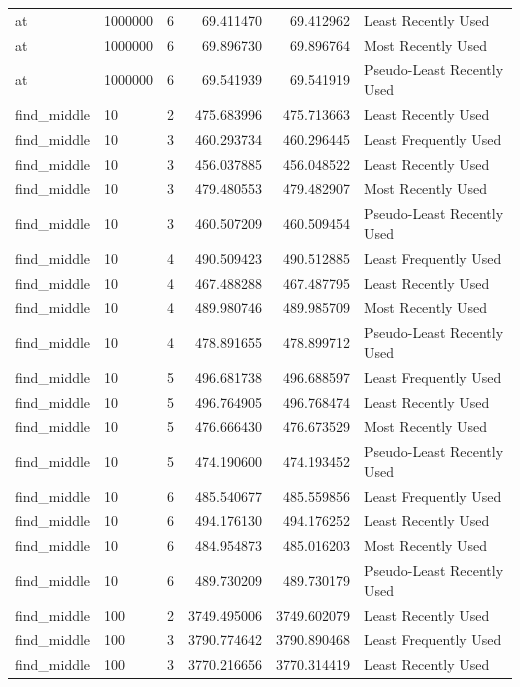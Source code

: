 \begin{tabular}{llrrrl}
at & 1000000 & 6 & 69.411470 & 69.412962 & Least Recently Used \\
at & 1000000 & 6 & 69.896730 & 69.896764 & Most Recently Used \\
at & 1000000 & 6 & 69.541939 & 69.541919 & Pseudo-Least Recently Used \\
find_middle & 10 & 2 & 475.683996 & 475.713663 & Least Recently Used \\
find_middle & 10 & 3 & 460.293734 & 460.296445 & Least Frequently Used \\
find_middle & 10 & 3 & 456.037885 & 456.048522 & Least Recently Used \\
find_middle & 10 & 3 & 479.480553 & 479.482907 & Most Recently Used \\
find_middle & 10 & 3 & 460.507209 & 460.509454 & Pseudo-Least Recently Used \\
find_middle & 10 & 4 & 490.509423 & 490.512885 & Least Frequently Used \\
find_middle & 10 & 4 & 467.488288 & 467.487795 & Least Recently Used \\
find_middle & 10 & 4 & 489.980746 & 489.985709 & Most Recently Used \\
find_middle & 10 & 4 & 478.891655 & 478.899712 & Pseudo-Least Recently Used \\
find_middle & 10 & 5 & 496.681738 & 496.688597 & Least Frequently Used \\
find_middle & 10 & 5 & 496.764905 & 496.768474 & Least Recently Used \\
find_middle & 10 & 5 & 476.666430 & 476.673529 & Most Recently Used \\
find_middle & 10 & 5 & 474.190600 & 474.193452 & Pseudo-Least Recently Used \\
find_middle & 10 & 6 & 485.540677 & 485.559856 & Least Frequently Used \\
find_middle & 10 & 6 & 494.176130 & 494.176252 & Least Recently Used \\
find_middle & 10 & 6 & 484.954873 & 485.016203 & Most Recently Used \\
find_middle & 10 & 6 & 489.730209 & 489.730179 & Pseudo-Least Recently Used \\
find_middle & 100 & 2 & 3749.495006 & 3749.602079 & Least Recently Used \\
find_middle & 100 & 3 & 3790.774642 & 3790.890468 & Least Frequently Used \\
find_middle & 100 & 3 & 3770.216656 & 3770.314419 & Least Recently Used \\

\end{tabular}
